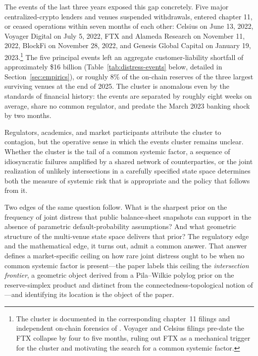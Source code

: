\documentclass[12pt]{article}
\theoremstyle{sampledef}
\theoremstyle{sampleplain}
\theoremstyle{sampleremark}
\newcommand{\1}{\mathbf{1}}
\begin{document}
The events of the last three years exposed this gap concretely.
Five major centralized-crypto lenders and venues suspended
withdrawals, entered chapter 11, or ceased operations within
seven months of each other: Celsius on June 13, 2022, Voyager
Digital on July 5, 2022, FTX and Alameda Research on
November 11, 2022, BlockFi on November 28, 2022, and Genesis
Global Capital on January 19, 2023.\footnote{The cluster is
documented in the corresponding
chapter~11 filings and independent on-chain forensics of
\citet{Griffin-Kruger2023}. Voyager and Celsius filings
pre-date the FTX collapse by four to five months, ruling out FTX
as a mechanical trigger for the cluster and motivating the search
for a common systemic factor.} The five principal events left an
aggregate customer-liability shortfall of approximately \$16 billion
(Table~\ref{tab:distress-events} below, detailed in
Section~\ref{sec:empirics}), or roughly $8\%$ of the on-chain
reserves of the three largest surviving venues at the end of 2025.
The cluster is anomalous even by the standards of financial history:
the events are separated by roughly eight weeks on average, share no
common regulator, and predate the March 2023 banking shock by two
months.

Regulators, academics, and market participants attribute the
cluster to contagion, but the operative sense in which the events
cluster remains unclear. Whether the cluster is the tail of a
common systemic factor, a sequence of idiosyncratic failures
amplified by a shared network of counterparties, or the joint
realization of unlikely intersections in a carefully specified
state space determines both the measure of systemic risk that is
appropriate and the policy that follows from it.

Two edges of the same question follow. What is the sharpest prior on
the frequency of joint distress that public balance-sheet snapshots
can support in the absence of parametric default-probability
assumptions? And what geometric structure of the multi-venue state
space delivers that prior? The regulatory edge and the mathematical
edge, it turns out, admit a common answer. That answer defines a
market-specific ceiling on how rare joint distress ought to be when
no common systemic factor is present---the paper labels this ceiling
the \emph{intersection frontier}, a geometric object derived from a
Pila--Wilkie polylog prior on the reserve-simplex product and distinct
from the connectedness-topological notion of
\citet{DieboldYilmaz2014}---and identifying its location is the
object of the paper.
\end{document}
